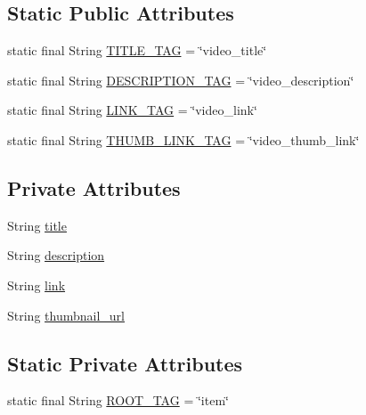 \subsection*{Static Public Attributes}
\begin{DoxyCompactItemize}
\item 
static final String \hyperlink{classorg_1_1buildmlearn_1_1toolkit_1_1templates_1_1VideoModel_aab6348f79865d09d59abad5e6cbd183b}{T\+I\+T\+L\+E\+\_\+\+T\+AG} = \char`\"{}video\+\_\+title\char`\"{}
\item 
static final String \hyperlink{classorg_1_1buildmlearn_1_1toolkit_1_1templates_1_1VideoModel_a1f721140cd45bbb5ebbdaa5568221830}{D\+E\+S\+C\+R\+I\+P\+T\+I\+O\+N\+\_\+\+T\+AG} = \char`\"{}video\+\_\+description\char`\"{}
\item 
static final String \hyperlink{classorg_1_1buildmlearn_1_1toolkit_1_1templates_1_1VideoModel_a8aa1bf92436324d2ccacf30118f4f12a}{L\+I\+N\+K\+\_\+\+T\+AG} = \char`\"{}video\+\_\+link\char`\"{}
\item 
static final String \hyperlink{classorg_1_1buildmlearn_1_1toolkit_1_1templates_1_1VideoModel_ae75b97da20f347a870884dbf4c9a7e1f}{T\+H\+U\+M\+B\+\_\+\+L\+I\+N\+K\+\_\+\+T\+AG} = \char`\"{}video\+\_\+thumb\+\_\+link\char`\"{}
\end{DoxyCompactItemize}
\subsection*{Private Attributes}
\begin{DoxyCompactItemize}
\item 
String \hyperlink{classorg_1_1buildmlearn_1_1toolkit_1_1templates_1_1VideoModel_a9c4cb7a2202cf993149e8fc5b46281da}{title}
\item 
String \hyperlink{classorg_1_1buildmlearn_1_1toolkit_1_1templates_1_1VideoModel_a7ad4b4bcca9e5f886e109f1e316eb76b}{description}
\item 
String \hyperlink{classorg_1_1buildmlearn_1_1toolkit_1_1templates_1_1VideoModel_a5ea9218247c35394a88dbc5c477e482c}{link}
\item 
String \hyperlink{classorg_1_1buildmlearn_1_1toolkit_1_1templates_1_1VideoModel_a8d4c0cecc8dca7168361462f629adb9f}{thumbnail\+\_\+url}
\end{DoxyCompactItemize}
\subsection*{Static Private Attributes}
\begin{DoxyCompactItemize}
\item 
static final String \hyperlink{classorg_1_1buildmlearn_1_1toolkit_1_1templates_1_1VideoModel_ab737966c7573130af6e50c336a76c285}{R\+O\+O\+T\+\_\+\+T\+AG} = \char`\"{}item\char`\"{}
\end{DoxyCompactItemize}


